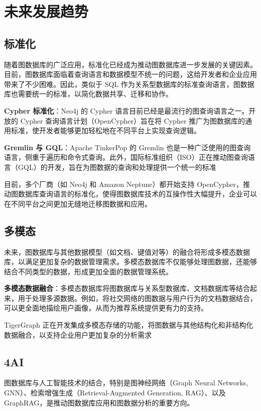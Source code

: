 \section{未来发展趋势}

\subsection{标准化}
随着图数据库的广泛应用，标准化已经成为推动图数据库进一步发展的关键因素。目前，图数据库面临着查询语言和数据模型不统一的问题，这给开发者和企业应用带来了不少困难。因此，类似于 SQL 作为关系型数据库的标准查询语言，图数据库也需要统一的标准，以简化数据共享、迁移和协作。

\textbf{Cypher 标准化}：Neo4j 的 Cypher 语言目前已经是最流行的图查询语言之一。开放的 Cypher 查询语言计划（OpenCypher）旨在将 Cypher 推广为图数据库的通用标准，使开发者能够更加轻松地在不同平台上实现查询逻辑。

\textbf{Gremlin 与 GQL}：Apache TinkerPop 的 Gremlin 也是一种广泛使用的图查询语言，侧重于遍历和命令式查询。此外，国际标准组织（ISO）正在推动图查询语言（GQL）的开发，旨在为图数据的查询和处理提供一个统一的标准

目前，多个厂商（如 Neo4j 和 Amazon Neptune）都开始支持 OpenCypher，推动图数据库查询语言的标准化，使得图数据库技术的互操作性大幅提升，企业可以在不同平台之间更加无缝地迁移图数据和应用。

\subsection{多模态}
未来，图数据库与其他数据模型（如文档、键值对等）的融合将形成多模态数据库，以满足更加复杂的数据管理需求。多模态数据库不仅能够处理图数据，还能够结合不同类型的数据，形成更加全面的数据管理系统。

\textbf{多模态数据融合}：多模态数据库将图数据库与关系型数据库、文档数据库等结合起来，用于处理多源数据。例如，将社交网络的图数据与用户行为的文档数据结合，可以更全面地描绘用户画像，从而为推荐系统提供更有力的支持\cite{han2021multimodal}。

TigerGraph 正在开发集成多模态存储的功能，将图数据与其他结构化和非结构化数据融合，以支持企业用户更加复杂的分析需求


\subsection{4AI}
图数据库与人工智能技术的结合，特别是图神经网络（Graph Neural Networks, GNN）、检索增强生成（Retrieval-Augmented Generation, RAG）、以及 GraphRAG，是推动图数据库应用和图数据分析的重要方向。


